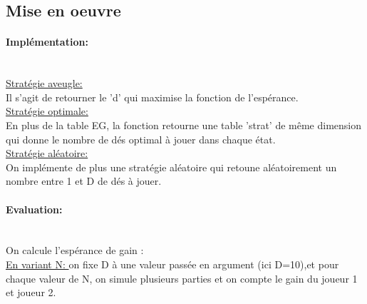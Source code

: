 \documentclass{report}
\begin{document}
\begin{large}
    \section{Mise en oeuvre}
    \paragraph{\large{Implémentation: }} \\
    \underline{Stratégie aveugle:}\\
    Il s'agit de retourner le 'd' qui maximise la fonction de l'espérance.\\
    \underline{Stratégie optimale:}\\
    En plus de la table EG, la fonction retourne une table 'strat' de même dimension qui donne 
    le nombre de dés optimal à jouer dans chaque état.\\ 
    \underline{Stratégie aléatoire:}\\
    On implémente de plus une stratégie aléatoire qui retoune aléatoirement un nombre entre 1 et D de dés à jouer. \\
    \paragraph{\large{Evaluation: }}\\
    On calcule l'espérance de gain :\\
    \underline{En variant N: } on fixe D à une valeur passée en argument (ici D=10),et pour 
    chaque valeur de N, on simule plusieurs parties et on compte le gain du joueur 1 et joueur 2.\\ 
    

\end{large}
\end{document}
